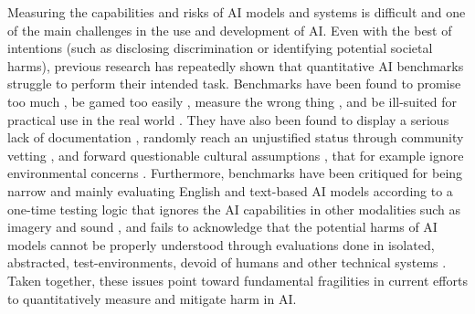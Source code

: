 Measuring the capabilities and risks of AI models and systems is difficult and one of the main challenges in the use and development of AI. Even with the best of intentions (such as disclosing discrimination or identifying potential societal harms), previous research has repeatedly shown that quantitative AI benchmarks struggle to perform their intended task. Benchmarks have been found to promise too much \cite{raji2021}, be gamed too easily \cite{weij2024, narayanan2023a}, measure the wrong thing \cite{oakden-rayner2019}, and be ill-suited for practical use in the real world \cite{bao2022a, ethayarajh2021}. They have also been found to display a serious lack of documentation \cite{reuel_betterbench_2024}, randomly reach an unjustified status through community vetting \cite{dehghani2021}, and forward questionable cultural assumptions \cite{kang2023, keegan2024}, that for example ignore environmental concerns \cite{hutchinson_evaluation_2022}. Furthermore, benchmarks have been critiqued for being narrow and mainly evaluating English \cite{mcintosh2024, rottger2024} and text-based AI models \cite{rauh2024} according to a one-time testing logic \cite{mizrahi2024} that ignores the AI capabilities in other modalities such as imagery and sound \cite{rauh2024}, and fails to acknowledge that the potential harms of AI models cannot be properly understood through evaluations done in isolated, abstracted, test-environments, devoid of humans \cite{rauh2024} and other technical systems \cite{birhane2024}. Taken together, these issues point toward fundamental fragilities in current efforts to quantitatively measure and mitigate harm in AI. 


